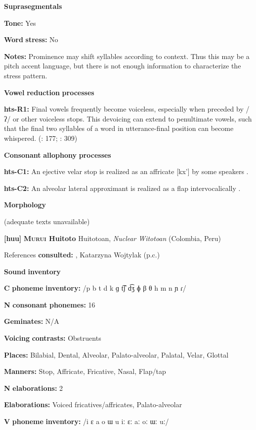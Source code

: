 \textbf{Suprasegmentals}

\textbf{Tone:} Yes

\textbf{Word} \textbf{stress:} No

\textbf{Notes:} Prominence may shift syllables according to context. Thus this may be a pitch accent language, but there is not enough information to characterize the stress pattern.

\textbf{Vowel} \textbf{reduction} \textbf{processes}

\textbf{hts-R1:} Final vowels frequently become voiceless, especially when preceded by /ʔ/ or other voiceless stops. This devoicing can extend to penultimate vowels, such that the final two syllables of a word in utterance-final position can become whispered. (\citealt{SandsEtAl1996}: 177; \citealt{TuckerEtAl1977}: 309)

\textbf{Consonant} \textbf{allophony} \textbf{processes}

\textbf{hts-C1:} An ejective velar stop is realized as an affricate [kx’] by some speakers \citep[41]{Sands2013}.

\textbf{hts-C2:} An alveolar lateral approximant is realized as a flap intervocalically \citep[41]{Sands2013}.

\textbf{Morphology}

(adequate texts unavailable)

\textbf{[huu]}   \textbf{\textsc{Murui} \textbf{Huitoto}  }  Huitotoan, \textit{Nuclear} \textit{Witotoan} (Colombia, Peru)

References \textbf{consulted:} \citet{Wojtylak2017}, Katarzyna Wojtylak (p.c.)

\textbf{Sound} \textbf{inventory}

\textbf{C} \textbf{phoneme} \textbf{inventory:} /p b t d k ɡ t͡ʃ d͡ʒ ɸ β θ h m n ɲ ɾ/

\textbf{N} \textbf{consonant} \textbf{phonemes:} 16

\textbf{Geminates:} N/A

\textbf{Voicing} \textbf{contrasts:} Obstruents

\textbf{Places:} Bilabial, Dental, Alveolar, Palato-alveolar, Palatal, Velar, Glottal

\textbf{Manners:} Stop, Affricate, Fricative, Nasal, Flap/tap

\textbf{N} \textbf{elaborations:} 2

\textbf{Elaborations:} Voiced fricatives/affricates, Palato-alveolar

\textbf{V} \textbf{phoneme} \textbf{inventory:} /i ɛ a o ɯ u iː ɛː aː oː ɯː uː/


